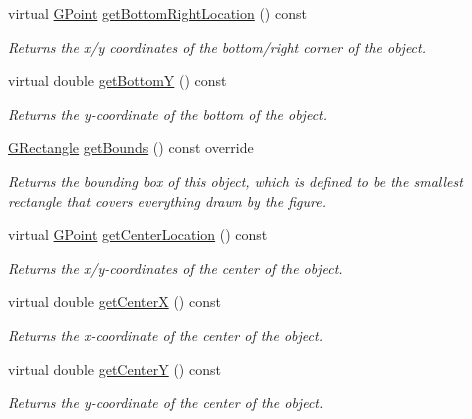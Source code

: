 \begin{DoxyCompactItemize}
virtual \mbox{\hyperlink{structsgl_1_1GPoint}{G\+Point}} \mbox{\hyperlink{classsgl_1_1GObject_a0d41183bf6b08de66fe3907551aab0d7}{get\+Bottom\+Right\+Location}} () const
\begin{DoxyCompactList}\small\item\em Returns the x/y coordinates of the bottom/right corner of the object. \end{DoxyCompactList}\item 
virtual double \mbox{\hyperlink{classsgl_1_1GObject_a4316a2406c18e1c6d061fe51fd355490}{get\+BottomY}} () const
\begin{DoxyCompactList}\small\item\em Returns the {\itshape y}-\/coordinate of the bottom of the object. \end{DoxyCompactList}\item 
\mbox{\hyperlink{structsgl_1_1GRectangle}{G\+Rectangle}} \mbox{\hyperlink{classsgl_1_1GCompound_a89040ce9277825772d359fccd33bca86}{get\+Bounds}} () const override
\begin{DoxyCompactList}\small\item\em Returns the bounding box of this object, which is defined to be the smallest rectangle that covers everything drawn by the figure. \end{DoxyCompactList}\item 
virtual \mbox{\hyperlink{structsgl_1_1GPoint}{G\+Point}} \mbox{\hyperlink{classsgl_1_1GObject_a0909472e91448470bccdb62ecfb95d8b}{get\+Center\+Location}} () const
\begin{DoxyCompactList}\small\item\em Returns the x/y-\/coordinates of the center of the object. \end{DoxyCompactList}\item 
virtual double \mbox{\hyperlink{classsgl_1_1GObject_a04df74355b545e0543112d5b8d924176}{get\+CenterX}} () const
\begin{DoxyCompactList}\small\item\em Returns the {\itshape x}-\/coordinate of the center of the object. \end{DoxyCompactList}\item 
virtual double \mbox{\hyperlink{classsgl_1_1GObject_acb3287a3d507025a26f54b895713b947}{get\+CenterY}} () const
\begin{DoxyCompactList}\small\item\em Returns the {\itshape y}-\/coordinate of the center of the object. \end{DoxyCompactList}\item 

\end{DoxyCompactItemize}
